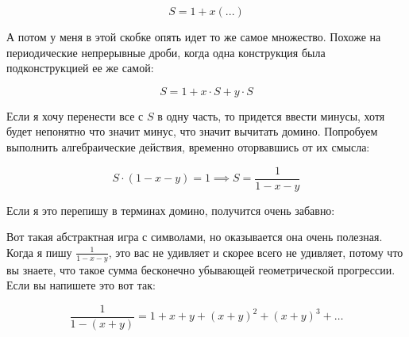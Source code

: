 \documentclass[russian]{lecture-notes}
\theoremstyle{definition}
\begin{document}
\begin{enumerate}
		\[
			S = 1 + x(...)
		\]
		
		А потом у меня в этой скобке опять идет то же самое множество. Похоже на периодические непрерывные дроби, когда одна конструкция была подконструкцией ее же самой:
		
		\[
		S = 1 + x \cdot S + y \cdot S
		\]
		
		Если я хочу перенести все с $S$ в одну часть, то придется ввести минусы, хотя будет непонятно что значит минус, что значит вычитать домино. Попробуем выполнить алгебраические действия, временно оторвавшись от их смысла:
		
		\[
			S \cdot (1 - x - y) = 1 \implies S = \frac{1}{1 - x - y}
		\]
		
		Если я это перепишу в терминах домино, получится очень забавно:
		
		\begin{figure}[H]
			\centering
		\end{figure}
	
		Вот такая абстрактная игра с символами, но оказывается она очень полезная. Когда я пишу $\frac{1}{1 - x - y}$, это вас не удивляет и скорее всего не удивляет, потому что вы знаете, что такое сумма бесконечно убывающей геометрической прогрессии. Если вы напишете это вот так:
		
		\[
			\frac{1}{1 - (x + y)} = 1 + x + y + (x + y)^2 + (x + y)^3 + \ldots
		\]
		

\end{enumerate}
\end{document}
